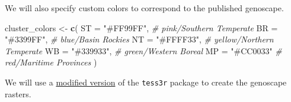 \documentclass[
]{book}
\newenvironment{Shaded}{\begin{snugshade}}{\end{snugshade}}
\newcommand{\AttributeTok}[1]{\textcolor[rgb]{0.13,0.29,0.53}{#1}}
\newcommand{\CommentTok}[1]{\textcolor[rgb]{0.56,0.35,0.01}{\textit{#1}}}
\newcommand{\FunctionTok}[1]{\textcolor[rgb]{0.13,0.29,0.53}{\textbf{#1}}}
\newcommand{\NormalTok}[1]{#1}
\newcommand{\OtherTok}[1]{\textcolor[rgb]{0.56,0.35,0.01}{#1}}
\newcommand{\StringTok}[1]{\textcolor[rgb]{0.31,0.60,0.02}{#1}}
\begin{document}
We will also specify custom colors to correspond to the published genoscape.

\begin{Shaded}
\begin{Highlighting}[]
\NormalTok{cluster\_colors }\OtherTok{\textless{}{-}}  \FunctionTok{c}\NormalTok{(}
  \StringTok{\textasciigrave{}}\AttributeTok{ST}\StringTok{\textasciigrave{}} \OtherTok{=} \StringTok{"\#FF99FF"}\NormalTok{, }\CommentTok{\# pink/Southern Temperate}
  \StringTok{\textasciigrave{}}\AttributeTok{BR}\StringTok{\textasciigrave{}} \OtherTok{=} \StringTok{"\#3399FF"}\NormalTok{, }\CommentTok{\# blue/Basin Rockies}
  \StringTok{\textasciigrave{}}\AttributeTok{NT}\StringTok{\textasciigrave{}} \OtherTok{=} \StringTok{"\#FFFF33"}\NormalTok{, }\CommentTok{\# yellow/Northern Temperate}
  \StringTok{\textasciigrave{}}\AttributeTok{WB}\StringTok{\textasciigrave{}} \OtherTok{=} \StringTok{"\#339933"}\NormalTok{, }\CommentTok{\# green/Western Boreal}
  \StringTok{\textasciigrave{}}\AttributeTok{MP}\StringTok{\textasciigrave{}} \OtherTok{=} \StringTok{"\#CC0033"} \CommentTok{\# red/Maritime Provinces}
\NormalTok{) }
\end{Highlighting}
\end{Shaded}

We will use a \href{https://github.com/eriqande/TESS3_encho_sen}{modified version} of the \texttt{tess3r} package to create the genoscape rasters.
\end{document}
